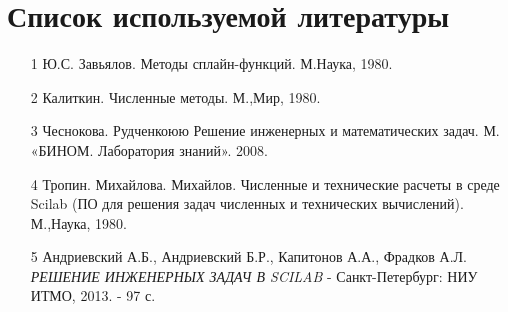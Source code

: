 \documentclass[russian,utf8,nocolumnxxxi,nocolumnxxxii]{eskdtext}
\begin{document}
\section{Список используемой литературы}
\begin{enumerate}
  \item[1]Ю.С. Завьялов. Методы сплайн-функций. М.Наука, 1980.
  \item[2]Калиткин. Численные методы. М.,Мир, 1980.
  \item[3]Чеснокова. Рудченкоюю Решение инженерных и математических задач. М. «БИНОМ. Лаборатория знаний». 2008.
  \item[4]Тропин. Михайлова. Михайлов. Численные и технические расчеты в среде Scilab
(ПО для решения задач
численных и технических вычислений).  М.,Наука, 1980.
\item[5]Андриевский А.Б., Андриевский Б.Р., Капитонов А.А., Фрадков А.Л. \textit{РЕШЕНИЕ ИНЖЕНЕРНЫХ ЗАДАЧ В SCILAB} - Санкт-Петербург: НИУ ИТМО, 2013. - 97 с.
\end{enumerate}
\end{document}
